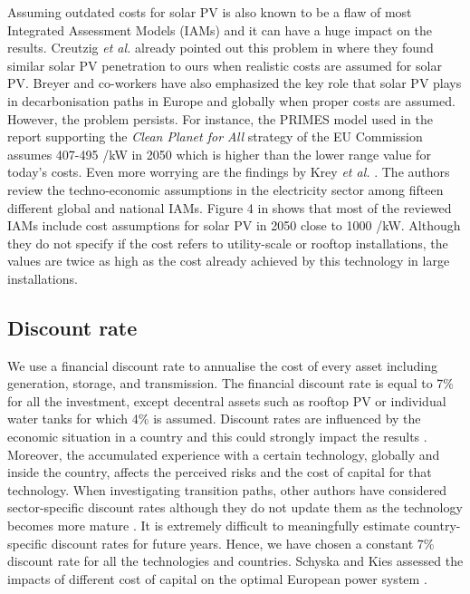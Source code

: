 \documentclass[3p]{elsarticle} %
\begin{document}
Assuming outdated costs for solar PV is also known to be a flaw of most Integrated Assessment Models (IAMs) and it can have a huge impact on the results. Creutzig \textit{et al.} already pointed out this problem in \cite{Creutzig_2017} where they found similar solar PV penetration to ours when realistic costs are assumed for solar PV. Breyer and co-workers have also emphasized the key role that solar PV plays in decarbonisation paths in Europe \cite{Child_2019} and globally \cite{Bogdanov_2019} when proper costs are assumed. However, the problem persists. For instance, the PRIMES model used in the report supporting the \textit{Clean Planet for All} strategy of the EU Commission \cite{in-depth_2018} assumes 407-495 \EUR/kW in 2050 \cite{in-depth-data} which is higher than the lower range value for today's costs. Even more worrying are the findings by Krey \textsl{et al.} \cite{Krey_2019}. The authors review the techno-economic assumptions in the electricity sector among fifteen different global and national IAMs. Figure 4 in \cite{Krey_2019} shows that most of the reviewed IAMs include cost assumptions for solar PV in 2050 close to 1000 \EUR/kW. Although they do not specify if the cost refers to utility-scale or rooftop installations, the values are twice as high as the cost already achieved by this technology in large installations. 

\subsection{Discount rate}

We use a financial discount rate to annualise the cost of every asset including generation, storage, and transmission. The financial discount rate is equal to 7\% for all the investment, except decentral assets such as rooftop PV or individual water tanks for which 4\% is assumed. Discount rates are influenced by the economic situation in a country and this could strongly impact the results \cite{Egli_2019}. Moreover, the accumulated experience with a certain technology, globally and inside the country, affects the perceived risks and the cost of capital for that technology. When investigating transition paths, other authors have considered sector-specific discount rates although they do not update them as the technology becomes more mature \cite{in-depth_2018}. It is extremely difficult to meaningfully estimate country-specific discount rates for future years. Hence, we have chosen a constant 7\% discount rate for all the technologies and countries. Schyska and Kies assessed the impacts of different cost of capital on the optimal European power system \cite{Schyska_2020}. \\
\end{document}
